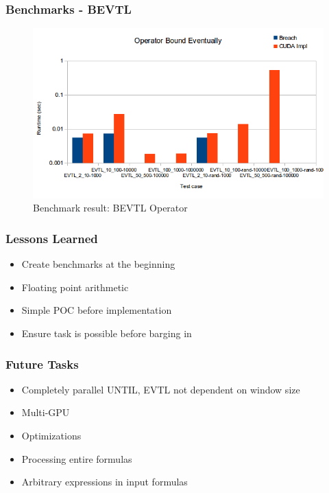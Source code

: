 \documentclass[notes=show]{beamer}
\begin{document}
\begin{frame}
\frametitle{Benchmarks - BEVTL}
\begin{figure}[H]
    \includegraphics[scale=0.5]{bm_bevtl.png}
    \caption{
        \label{fig:bm_bevtl}
        Benchmark result: BEVTL Operator}
\end{figure}
\end{frame}

\begin{frame}
\frametitle{Lessons Learned}
\begin{itemize}
\item Create benchmarks at the beginning
\item Floating point arithmetic
\item Simple POC before implementation
\item Ensure task is possible before barging in
\end{itemize}
\end{frame}

\begin{frame}
\frametitle{Future Tasks}
\begin{itemize}
\item Completely parallel UNTIL, EVTL not dependent on window size
\item Multi-GPU
\item Optimizations
\item Processing entire formulas
\item Arbitrary expressions in input formulas
\end{itemize}
\end{frame}
\end{document}
